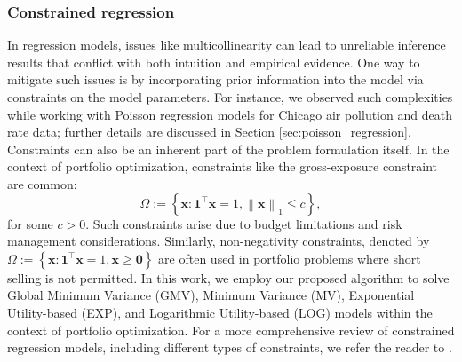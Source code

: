 \documentclass[aos]{imsart}
\numberwithin{equation}{section}
\theoremstyle{plain}
\begin{document}
\subsubsection{Constrained regression}
\label{sec_constrained_regression}
In regression models, issues like multicollinearity can lead to unreliable inference results that conflict with both intuition and empirical evidence. One way to mitigate such issues is by incorporating prior information into the model via constraints on the model parameters.
For instance, we observed such complexities while working with Poisson regression models for Chicago air pollution and death rate data; further details are discussed in Section \ref{sec:poisson_regression}.
Constraints can also be an inherent part of the problem formulation itself.
In the context of portfolio optimization, constraints like the gross-exposure constraint \cite{fan2012vast} are common:
\begin{equation*}
    \Omega := \left\{\bm{x}: \bm{1}^{\top} \bm{x} = 1, \left\| \bm{x} \right\|_1 \leq c\right\},
\end{equation*}
for some $c > 0$. Such constraints arise due to budget limitations and risk management considerations.
Similarly, non-negativity constraints, denoted by $\Omega := \left\{\bm{x}: \bm{1}^{\top} \bm{x} = 1, \bm{x} \geq \bm{0}\right\}$ are often used in portfolio problems where short selling is not permitted. 
In this work, we employ our proposed algorithm to solve Global Minimum Variance (GMV), Minimum Variance (MV), Exponential Utility-based (EXP), and Logarithmic Utility-based (LOG) models within the context of portfolio optimization. For a more comprehensive review of constrained regression models, including different types of constraints, we refer the reader to \cite{fan2012vast, shapiro2000asymptotics, du2023high, sen1979asymptotic, na2021high, dupacova1988asymptotic, na2019high}.
\end{document}
